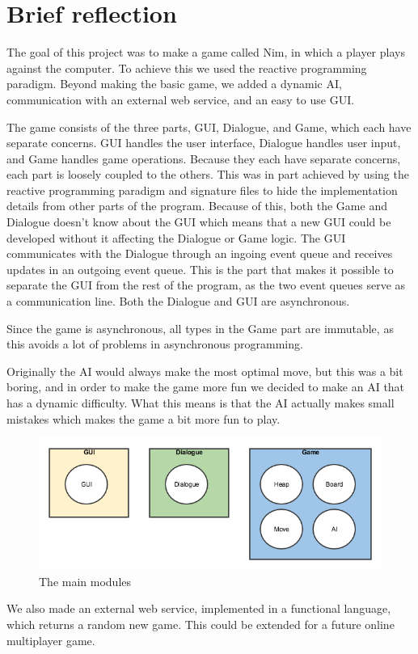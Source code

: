 \documentclass[12pt]{article}
\begin{document}
\clearpage\maketitle
\thispagestyle{empty}

\section*{Brief reflection}
The goal of this project was to make a game called Nim, in which a player plays against the computer. To achieve this we used the reactive programming paradigm. Beyond making the basic game, we added a dynamic AI, communication with an external web service, and an easy to use GUI. 

The game consists of the three parts, GUI, Dialogue, and Game, which each have separate concerns. GUI handles the user interface, Dialogue handles user input, and Game handles game operations. Because they each have separate concerns, each part is loosely coupled to the others. This was in part achieved by using the reactive programming paradigm and signature files to hide the implementation details from other parts of the program. Because of this, both the Game and Dialogue doesn't know about the GUI which means that a new GUI could be developed without it affecting the Dialogue or Game logic. The GUI communicates with the Dialogue through an ingoing event queue and receives updates in an outgoing event queue. This is the part that makes it possible to separate the GUI from the rest of the program, as the two event queues serve as a communication line. Both the Dialogue and GUI are asynchronous. 

Since the game is asynchronous, all types in the Game part are immutable, as this avoids a lot of problems in asynchronous programming. 

Originally the AI would always make the most optimal move, but this was a bit boring, and in order to make the game more fun we decided to make an AI that has a dynamic difficulty. What this means is that the AI actually makes small mistakes which makes the game a bit more fun to play.
\begin{figure}[h]
\begin{center}
\includegraphics[scale=.45]{img/modules.png}
\caption{The main modules}
\end{center}
\label{fig:modules}
\end{figure}
We also made an external web service, implemented in a functional language, which returns a random new game. This could be extended for a future online multiplayer game.
\end{document}
